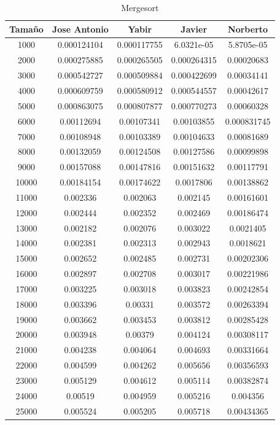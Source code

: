 \documentclass[11pt,a4paper]{article}
\begin{document}
\begin{table}[h]
	\centering
	\caption{Mergesort}
	\begin{tabular}{ | c | c  | c | c | c | }
		\hline
		Tama\~no & Jose Antonio & Yabir & Javier & Norberto\\ 
		\hline
		1000	&	0.000124104	&	0.000117755	&	6.0321e-05	&	5.8705e-05	\\
		2000	&	0.000275885	&	0.000265505	&	0.000264315	&	0.00020683	\\
		3000	&	0.000542727	&	0.000509884	&	0.000422699	&	0.00034141	\\
		4000	&	0.000609759	&	0.000580912	&	0.000544557	&	0.00042617	\\
		5000	&	0.000863075	&	0.000807877	&	0.000770273	&	0.00060328	\\
		6000	&	0.00112694	&	0.00107341	&	0.00103855	&	0.000831745	\\
		7000	&	0.00108948	&	0.00103389	&	0.00104633	&	0.00081689	\\
		8000	&	0.00132059	&	0.00124508	&	0.00127586	&	0.00099898	\\
		9000	&	0.00157088	&	0.00147816	&	0.00151632	&	0.00117791	\\
		10000	&	0.00184154	&	0.00174622	&	0.0017806	&	0.00138862	\\
		11000	&	0.002336	&	0.002063	&	0.002145	&	0.00161601	\\
		12000	&	0.002444	&	0.002352	&	0.002469	&	0.00186474	\\
		13000	&	0.002182	&	0.002076	&	0.003022	&	0.0021405	\\
		14000	&	0.002381	&	0.002313	&	0.002943	&	0.0018621	\\
		15000	&	0.002652	&	0.002485	&	0.002731	&	0.00202306	\\
		16000	&	0.002897	&	0.002708	&	0.003017	&	0.00221986	\\
		17000	&	0.003225	&	0.003018	&	0.003823	&	0.00242854	\\
		18000	&	0.003396	&	0.00331	&	0.003572	&	0.00263394	\\
		19000	&	0.003662	&	0.003453	&	0.003812	&	0.00285428	\\
		20000	&	0.003948	&	0.00379	&	0.004124	&	0.00308117	\\
		21000	&	0.004238	&	0.004064	&	0.004693	&	0.00331664	\\
		22000	&	0.004599	&	0.004262	&	0.005656	&	0.00356593	\\
		23000	&	0.005129	&	0.004612	&	0.005114	&	0.00382874	\\
		24000	&	0.00519	&	0.004959	&	0.005216	&	0.004356	\\
		25000	&	0.005524	&	0.005205	&	0.005718	&	0.00434365	\\
		\hline
	\end{tabular}
\end{table}
\end{document}
